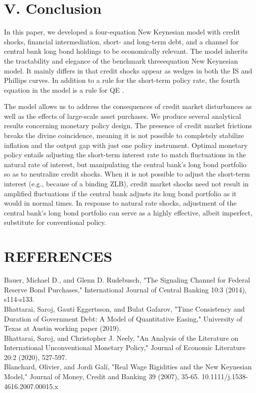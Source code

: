 \documentclass[10pt]{article}
\begin{document}
\section*{V. Conclusion}
In this paper, we developed a four-equation New Keynesian model with credit shocks, financial intermediation, short- and long-term debt, and a channel for central bank long bond holdings to be economically relevant. The model inherits the tractability and elegance of the benchmark threeequation New Keynesian model. It mainly differs in that credit shocks appear as wedges in both the IS and Phillips curves. In addition to a rule for the short-term policy rate, the fourth equation in the model is a rule for QE .

The model allows us to address the consequences of credit market disturbances as well as the effects of large-scale asset purchases. We produce several analytical results concerning monetary policy design. The presence of credit market frictions breaks the divine coincidence, meaning it is not possible to completely stabilize inflation and the output gap with just one policy instrument. Optimal monetary policy entails adjusting the short-term interest rate to match fluctuations in the natural rate of interest, but manipulating the central bank's long bond portfolio so as to neutralize credit shocks. When it is not possible to adjust the short-term interest (e.g., because of a binding ZLB), credit market shocks need not result in amplified fluctuations if the central bank adjusts its long bond portfolio as it would in normal times. In response to natural rate shocks, adjustment of the central bank's long bond portfolio can serve as a highly effective, albeit imperfect, substitute for conventional policy.

\section*{REFERENCES}
Bauer, Michael D., and Glenn D. Rudebusch, "The Signaling Channel for Federal Reserve Bond Purchases," International Journal of Central Banking 10:3 (2014), s114-s133.\\
Bhattarai, Saroj, Gauti Eggertsson, and Bulat Gafarov, "Time Consistency and Duration of Government Debt: A Model of Quantitative Easing," University of Texas at Austin working paper (2019).\\
Bhattarai, Saroj, and Christopher J. Neely, "An Analysis of the Literature on International Unconventional Monetary Policy," Journal of Economic Literature 20:2 (2020), 527-597.\\
Blanchard, Olivier, and Jordi Galí, "Real Wage Rigidities and the New Keynesian Model," Journal of Money, Credit and Banking 39 (2007), 35-65. 10.1111/j.1538-4616.2007.00015.x
\end{document}
